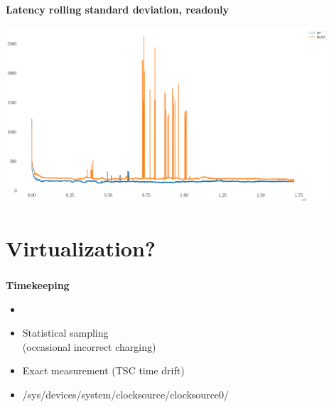 \documentclass[usenames,dvipsnames, 18pt, compress, aspectratio=169]{beamer}
\begin{document}
\begin{frame}
    \frametitle{}
    \begin{center}
    \textbf{Latency rolling standard deviation, readonly}

        \includegraphics[width=0.9\textwidth,center]{hyperthreading_readonly.png}

    \end{center}
\end{frame}

\fontsize{13pt}{14}\selectfont
\section{Virtualization?}
\fontsize{17pt}{18}\selectfont

\begin{frame}
    \frametitle{}
    \begin{center}
    \textbf{Timekeeping}

        \begin{itemize}
            \item <+->
        \end{itemize}

        \begin{itemize}[label={\MVRightarrow}]
            \item <+-> Statistical sampling \\ (occasional incorrect charging)
            \item <+-> Exact measurement (TSC time drift)
            \item <+-> /sys/devices/system/clocksource/clocksource0/
        \end{itemize}

    \end{center}
\end{frame}
\end{document}
